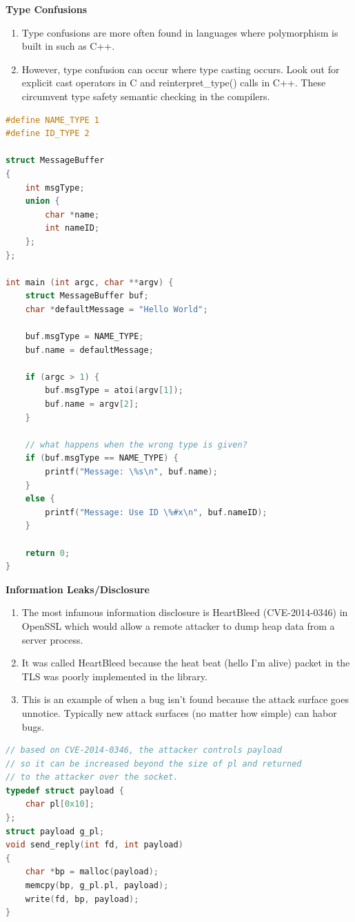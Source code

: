 \documentclass[12pt]{Training}
\begin{document}
\textbf{Type Confusions}
\begin{enumerate}
    \item Type confusions are more often found in languages where polymorphism is built in such as C++.
    \item However, type confusion can occur where type casting occurs. Look out for explicit cast operators in C and reinterpret\_type() calls in C++. These circumvent type safety semantic checking in the compilers.
\end{enumerate}
\begin{sectionbox}
\begin{lstlisting}[language=C, caption={Type Confusion}]
#define NAME_TYPE 1
#define ID_TYPE 2

struct MessageBuffer
{
    int msgType;
    union {
        char *name;
        int nameID;
    };
};

int main (int argc, char **argv) {
    struct MessageBuffer buf;
    char *defaultMessage = "Hello World";

    buf.msgType = NAME_TYPE;
    buf.name = defaultMessage;

    if (argc > 1) {
        buf.msgType = atoi(argv[1]);
        buf.name = argv[2];
    }

    // what happens when the wrong type is given?
    if (buf.msgType == NAME_TYPE) {
        printf("Message: \%s\n", buf.name);
    }
    else {
        printf("Message: Use ID \%#x\n", buf.nameID);
    }

    return 0;
}
\end{lstlisting}
\end{sectionbox}

\textbf{Information Leaks/Disclosure}
\begin{enumerate}
    \item The most infamous information disclosure is HeartBleed (CVE-2014-0346) in OpenSSL which would allow a remote attacker to dump heap data from a server process.
    \item It was called HeartBleed because the heat beat (hello I'm alive) packet in the TLS was poorly implemented in the library.
    \item This is an example of when a bug isn't found because the attack surface goes unnotice. Typically new attack surfaces (no matter how simple) can habor bugs.
\end{enumerate}
\begin{sectionbox}
\begin{lstlisting}[language=C, caption={Info Leak}]
// based on CVE-2014-0346, the attacker controls payload
// so it can be increased beyond the size of pl and returned
// to the attacker over the socket.
typedef struct payload {
    char pl[0x10];
};
struct payload g_pl;
void send_reply(int fd, int payload)
{
    char *bp = malloc(payload);
    memcpy(bp, g_pl.pl, payload);
    write(fd, bp, payload);
}
\end{lstlisting}
\end{sectionbox}
\end{document}
